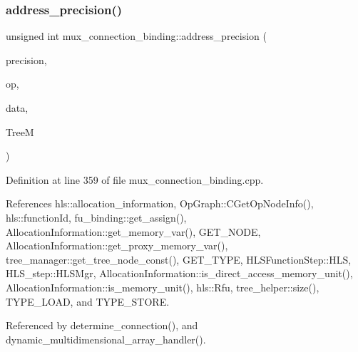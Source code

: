 \subsubsection{\texorpdfstring{address\+\_\+precision()}{address\_precision()}}
{\footnotesize\ttfamily unsigned int mux\+\_\+connection\+\_\+binding\+::address\+\_\+precision (\begin{DoxyParamCaption}\item[{unsigned int}]{precision,  }\item[{const \hyperlink{graph_8hpp_abefdcf0544e601805af44eca032cca14}{vertex} \&}]{op,  }\item[{const \hyperlink{op__graph_8hpp_a9a0b240622c47584bee6951a6f5de746}{Op\+Graph\+Const\+Ref}}]{data,  }\item[{const \hyperlink{tree__manager_8hpp_a96ff150c071ce11a9a7a1e40590f205e}{tree\+\_\+manager\+Ref}}]{TreeM }\end{DoxyParamCaption})\hspace{0.3cm}{\ttfamily [private]}}



Definition at line 359 of file mux\+\_\+connection\+\_\+binding.\+cpp.



References hls\+::allocation\+\_\+information, Op\+Graph\+::\+C\+Get\+Op\+Node\+Info(), hls\+::function\+Id, fu\+\_\+binding\+::get\+\_\+assign(), Allocation\+Information\+::get\+\_\+memory\+\_\+var(), G\+E\+T\+\_\+\+N\+O\+DE, Allocation\+Information\+::get\+\_\+proxy\+\_\+memory\+\_\+var(), tree\+\_\+manager\+::get\+\_\+tree\+\_\+node\+\_\+const(), G\+E\+T\+\_\+\+T\+Y\+PE, H\+L\+S\+Function\+Step\+::\+H\+LS, H\+L\+S\+\_\+step\+::\+H\+L\+S\+Mgr, Allocation\+Information\+::is\+\_\+direct\+\_\+access\+\_\+memory\+\_\+unit(), Allocation\+Information\+::is\+\_\+memory\+\_\+unit(), hls\+::\+Rfu, tree\+\_\+helper\+::size(), T\+Y\+P\+E\+\_\+\+L\+O\+AD, and T\+Y\+P\+E\+\_\+\+S\+T\+O\+RE.



Referenced by determine\+\_\+connection(), and dynamic\+\_\+multidimensional\+\_\+array\+\_\+handler().

